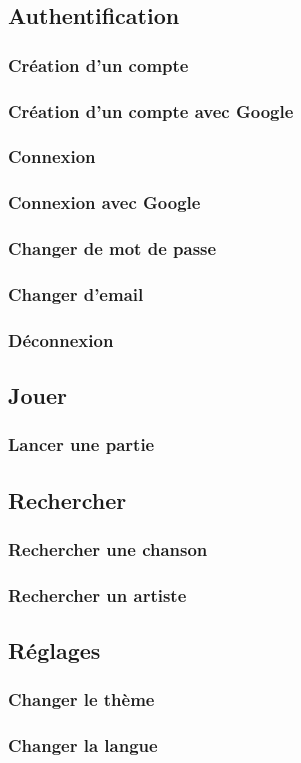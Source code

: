 \subsection{Authentification}
\subsubsection{Création d'un compte}
\subsubsection{Création d'un compte avec Google}
\subsubsection{Connexion}
\subsubsection{Connexion avec Google}
\subsubsection{Changer de mot de passe}
\subsubsection{Changer d'email}
\subsubsection{Déconnexion}
\subsection{Jouer}
\subsubsection{Lancer une partie}
\subsection{Rechercher}
\subsubsection{Rechercher une chanson}
\subsubsection{Rechercher un artiste}
\subsection{Réglages}
\subsubsection{Changer le thème}
\subsubsection{Changer la langue}
